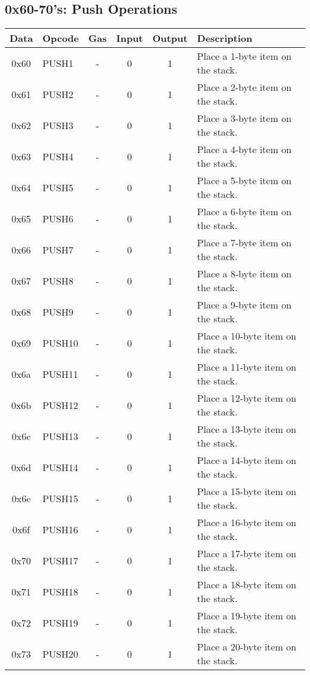 \documentclass[10pt,letterpaper,leqno,bibliography=totoc]{scrartcl}
\newenvironment{alphafootnotes}
{\par\edef\savedfootnotenumber{\number\value{footnote}}
\renewcommand{\thefootnote}{\alph{footnote}}
\setcounter{footnote}{0}}
{\par\setcounter{footnote}{\savedfootnotenumber}}
\begin{document}
\begin{alphafootnotes}
		\subsection{0x60-70's: Push Operations}
			\begin{longtable}{|cP{2.8cm}cccp{6cm}|}
        		\hline
        		\textbf{Data} & \textbf{Opcode} & \textbf{Gas}  & \textbf{Input}  & \textbf{Output} & \textbf{Description} \\
        		\hline
			0x60 & PUSH1 & - & 0 & 1 & Place a 1-byte item on the stack. \\
			0x61 & PUSH2 & - & 0 & 1 & Place a 2-byte item on the stack. \\
			0x62 & PUSH3 & - & 0 & 1 & Place a 3-byte item on the stack. \\
			0x63 & PUSH4 & - & 0 & 1 & Place a 4-byte item on the stack. \\
			0x64 & PUSH5 & - & 0 & 1 & Place a 5-byte item on the stack. \\
			0x65 & PUSH6 & - & 0 & 1 & Place a 6-byte item on the stack. \\
			0x66 & PUSH7 & - & 0 & 1 & Place a 7-byte item on the stack. \\
			0x67 & PUSH8 & - & 0 & 1 & Place a 8-byte item on the stack. \\
			0x68 & PUSH9 & - & 0 & 1 & Place a 9-byte item on the stack. \\
			0x69 & PUSH10 & - & 0 & 1 & Place a 10-byte item on the stack. \\
			0x6a & PUSH11 & - & 0 & 1 & Place a 11-byte item on the stack. \\
			0x6b & PUSH12 & - & 0 & 1 & Place a 12-byte item on the stack. \\
			0x6c & PUSH13 & - & 0 & 1 & Place a 13-byte item on the stack. \\
			0x6d & PUSH14 & - & 0 & 1 & Place a 14-byte item on the stack. \\
			0x6e & PUSH15 & - & 0 & 1 & Place a 15-byte item on the stack. \\
			0x6f & PUSH16 & - & 0 & 1 & Place a 16-byte item on the stack. \\
			0x70 & PUSH17 & - & 0 & 1 & Place a 17-byte item on the stack. \\
			0x71 & PUSH18 & - & 0 & 1 & Place a 18-byte item on the stack. \\
			0x72 & PUSH19 & - & 0 & 1 & Place a 19-byte item on the stack. \\
			0x73 & PUSH20 & - & 0 & 1 & Place a 20-byte item on the stack. \\

\end{longtable}
\end{alphafootnotes}
\end{document}
